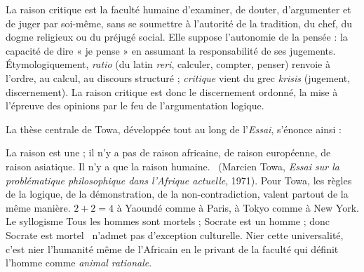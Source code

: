 \documentclass[11pt]{article}
\newcommand{\cle}[1]{{\popxbold\color{popdark}#1}}
\begin{document}
\begin{definition}
La \cle{raison critique} est la faculté humaine d'examiner, de douter, d'argumenter et de juger par soi-même, sans se soumettre à l'autorité de la tradition, du chef, du dogme religieux ou du préjugé social. Elle suppose l'autonomie de la pensée : la capacité de dire « je pense » en assumant la responsabilité de ses jugements. Étymologiquement, \emph{ratio} (du latin \emph{reri}, calculer, compter, penser) renvoie à l'ordre, au calcul, au discours structuré ; \emph{critique} vient du grec \emph{krisis} (jugement, discernement). La raison critique est donc le discernement ordonné, la mise à l'épreuve des opinions par le feu de l'argumentation logique.
\end{definition}

La thèse centrale de Towa, développée tout au long de l'\emph{Essai}, s'énonce ainsi :

\begin{propriete}
\guillemotleft La raison est une ; il n'y a pas de raison africaine, de raison européenne, de raison asiatique. Il n'y a que la raison humaine. \guillemotright\ (Marcien Towa, \emph{Essai sur la problématique philosophique dans l'Afrique actuelle}, 1971). Pour Towa, les règles de la logique, de la démonstration, de la non-contradiction, valent partout de la même manière. $2+2=4$ à Yaoundé comme à Paris, à Tokyo comme à New York. Le syllogisme \guillemotleft Tous les hommes sont mortels ; Socrate est un homme ; donc Socrate est mortel \guillemotright\ n'admet pas d'exception culturelle. Nier cette universalité, c'est nier l'humanité même de l'Africain en le privant de la faculté qui définit l'homme comme \emph{animal rationale}.
\end{propriete}
\end{document}
